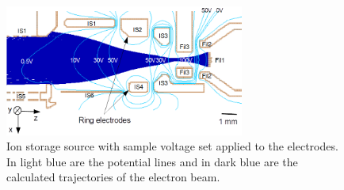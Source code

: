 		\begin{figure}[H]
			\centering
			\includegraphics[width = 0.7\textwidth]{Experiments/FiL_IS_elBeam_Storage.png}
			\caption{Ion storage source with sample voltage set applied to the electrodes. In light blue are the potential lines and in dark blue are the calculated trajectories of the electron beam.}
			\label{fig:ExpFSFlightSenIonStorIS}
		\end{figure}
